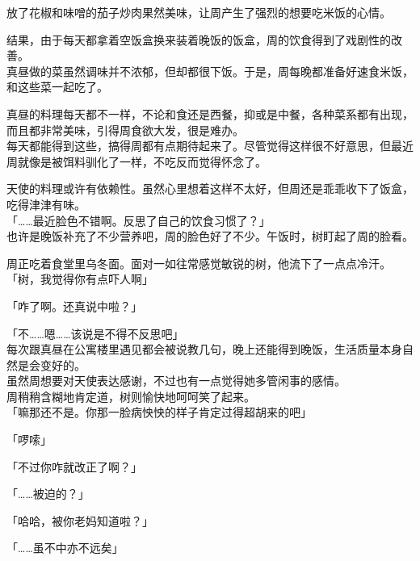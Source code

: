 放了花椒和味噌的茄子炒肉果然美味，让周产生了强烈的想要吃米饭的心情。\\

\vspace{2\baselineskip}

结果，由于每天都拿着空饭盒换来装着晚饭的饭盒，周的饮食得到了戏剧性的改善。\\

真昼做的菜虽然调味并不浓郁，但却都很下饭。于是，周每晚都准备好速食米饭，和这些菜一起吃了。

真昼的料理每天都不一样，不论和食还是西餐，抑或是中餐，各种菜系都有出现，而且都非常美味，引得周食欲大发，很是难办。\\

每天都能得到这些，搞得周都有点期待起来了。尽管觉得这样很不好意思，但最近周就像是被饵料驯化了一样，不吃反而觉得怀念了。

天使的料理或许有依赖性。虽然心里想着这样不太好，但周还是乖乖收下了饭盒，吃得津津有味。\\

「……最近脸色不错啊。反思了自己的饮食习惯了？」\\

也许是晚饭补充了不少营养吧，周的脸色好了不少。午饭时，树盯起了周的脸看。

周正吃着食堂里乌冬面。面对一如往常感觉敏锐的树，他流下了一点点冷汗。\\

「树，我觉得你有点吓人啊」

「咋了啊。还真说中啦？」

「不……嗯……该说是不得不反思吧」\\

每次跟真昼在公寓楼里遇见都会被说教几句，晚上还能得到晚饭，生活质量本身自然是会变好的。\\

虽然周想要对天使表达感谢，不过也有一点觉得她多管闲事的感情。\\

周稍稍含糊地肯定道，树则愉快地呵呵笑了起来。\\

「嘛那还不是。你那一脸病怏怏的样子肯定过得超胡来的吧」

「啰嗦」

「不过你咋就改正了啊？」

「……被迫的？」

「哈哈，被你老妈知道啦？」

「……虽不中亦不远矣」\\

